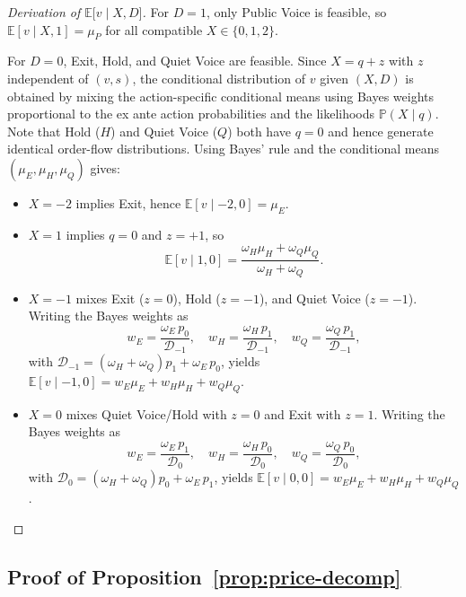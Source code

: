 \documentclass[11pt]{article}
\newcommand{\E}{\mathbb{E}}
\newcommand{\PP}{\mathbb{P}}
\newcommand{\1}{\mathbf{1}}
\begin{document}
\begin{proof}[Derivation of $\E\lbrack v \mid X,D\rbrack$]
For $D=1$, only Public Voice is feasible, so $\E[v \mid X,1]=\mu_P$ for all compatible $X\in\{0,1,2\}$.

For $D=0$, Exit, Hold, and Quiet Voice are feasible. Since $X=q+z$ with $z$ independent of $(v,s)$, the conditional distribution of $v$ given $(X,D)$ is obtained by mixing the action-specific conditional means using Bayes weights proportional to the ex ante action probabilities and the likelihoods $\PP(X \mid q)$. Note that Hold ($H$) and Quiet Voice ($Q$) both have $q=0$ and hence generate identical order-flow distributions. Using Bayes' rule and the conditional means $(\mu_E,\mu_H,\mu_Q)$ gives:
\begin{itemize}[leftmargin=1.5em,itemsep=0pt]
\item $X=-2$ implies Exit, hence $\E[v \mid -2,0]=\mu_E$.
\item $X=1$ implies $q=0$ and $z=+1$, so
\[
\E[v \mid 1,0] = \frac{\omega_H \mu_H + \omega_Q \mu_Q}{\omega_H + \omega_Q}.
\]
\item $X=-1$ mixes Exit ($z=0$), Hold ($z=-1$), and Quiet Voice ($z=-1$). Writing the Bayes weights as
\[
w_E=\frac{\omega_E\,p_0}{\mathcal{D}_{-1}},\quad
w_H=\frac{\omega_H\,p_1}{\mathcal{D}_{-1}},\quad
w_Q=\frac{\omega_Q\,p_1}{\mathcal{D}_{-1}},
\]
with $\mathcal{D}_{-1}=(\omega_H+\omega_Q)p_1+\omega_E\,p_0$, yields $\E[v \mid -1,0]=w_E\mu_E+w_H\mu_H+w_Q\mu_Q$.
\item $X=0$ mixes Quiet Voice/Hold with $z=0$ and Exit with $z=1$. Writing the Bayes weights as
\[
w_E=\frac{\omega_E\,p_1}{\mathcal{D}_0},\quad
w_H=\frac{\omega_H\,p_0}{\mathcal{D}_0},\quad
w_Q=\frac{\omega_Q\,p_0}{\mathcal{D}_0},
\]
with $\mathcal{D}_0=(\omega_H+\omega_Q)p_0+\omega_E\,p_1$, yields $\E[v \mid 0,0]=w_E\mu_E+w_H\mu_H+w_Q\mu_Q$.
\end{itemize}
\end{proof}

\subsection{Proof of Proposition~\ref{prop:price-decomp}}
\label{app:proof-price-decomp}
\end{document}
